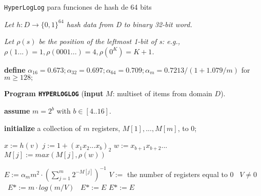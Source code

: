 \begin{algorithm}[h!]
\caption{\texttt{HyperLogLog} para funciones de hash de 64 bits}
\label{algoritmo:hyper2}
\textit{Let $h: D\rightarrow \{0,1\}^{64}$ hash data from D to binary 32-bit word.}

\textit{Let $\rho(s)$ be the position of the leftmost 1-bit of s: e.g.,
$\rho(1...) = 1, \rho(0001...) = 4, \rho(0^K) = K + 1$.}

\textbf{define} $\alpha_{16}=0.673;\alpha_{32}=0.697;\alpha_{64}=0.709;\alpha_m=0.7213/(1+1.079/m)$
for $m \geq 128;$

\textbf{Program \texttt{HYPERLOGLOG}} (\textbf{input} $M$: multiset of items from domain $D$).

\textbf{assume} $m=2^b$ with $ b\in[4..16]$.

\textbf{initialize} a collection of $m$ registers, $M[1],...,M[m]$, to 0;

\begin{algorithmic}
            \STATE $x  := h(v)$
            \STATE $j   := 1 + (x_1 x_2 ... x_b)_2$ 
            \STATE $w := x_{b+1} x_{b+2} ... $
            \STATE $M[j] := max(M[j],\rho(w))$
    \ENDFOR

    \STATE $E:=\alpha _m m^2·\left(\sum\limits_{j=1}^m 2^{-M[j]}\right)^{-1}$ 
        \STATE $V :=$ the number of registers equal to $0$
        \STATE \algorithmicif\ $V \neq 0$ \algorithmicthen\ $E* := m \cdot log(m / V)$ \algorithmicelse\ $E* := E$
    \ELSE
        \STATE $E*:=E$
    \ENDIF
\end{algorithmic}
\end{algorithm}

\newpage